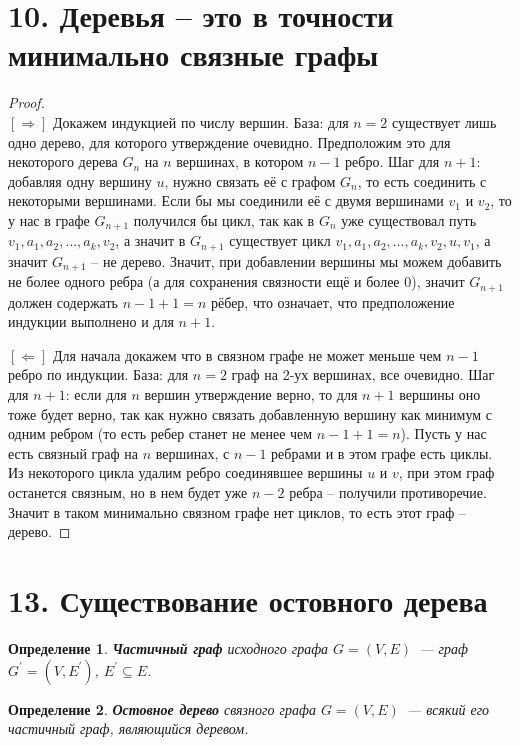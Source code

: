 \documentclass[a4paper,12pt]{article}
\newtheorem*{defin}{Определение}
\begin{document}
    \section*{10. Деревья -- это в точности минимально связные графы}
    \begin{proof}\ \\
        $[\Rightarrow]$ Докажем индукцией по числу вершин. База: для $n = 2$ существует лишь одно дерево, для которого утверждение очевидно. Предположим это для некоторого дерева $G_{n}$ на $n$ вершинах, в котором $n - 1$ ребро. Шаг для $n + 1$: добавляя одну вершину $u$, нужно связать её с графом $G_{n}$, то есть соединить с некоторыми вершинами. Если бы мы соединили её с двумя вершинами $v_{1}$ и $v_{2}$, то у нас в графе $G_{n+1}$ получился бы цикл, так как в $G_{n}$ уже существовал путь $v_{1}, a_{1}, a_{2},\ldots, a_{k}, v_{2}$, а значит в $G_{n+1}$ существует цикл $v_{1}, a_{1}, a_{2},\ldots, a_{k}, v_{2}, u, v_{1}$, а значит $G_{n+1}$ -- не дерево. Значит, при добавлении вершины мы можем добавить не более одного ребра (а для сохранения связности ещё и более 0), значит $G_{n+1}$ должен содержать $n - 1 + 1 = n$ рёбер, что означает, что предположение индукции выполнено и для $n + 1$.
        
        \noindent$[\Leftarrow]$ Для начала докажем что в связном графе не может меньше чем $n - 1$ ребро по индукции. База: для $n = 2$ граф на 2-ух вершинах, все очевидно. Шаг для $n + 1$: если для $n$ вершин утверждение верно, то для $n + 1$ вершины оно тоже будет верно, так как нужно связать добавленную вершину как минимум с одним ребром (то есть ребер станет не менее чем $n - 1 + 1 = n$). Пусть у нас есть связный граф на $n$ вершинах, с $n - 1$ ребрами и в этом графе есть циклы. Из некоторого цикла удалим ребро соединявшее вершины $u$ и $v$, при этом граф останется связным, но в нем будет уже $n - 2$ ребра -- получили противоречие. Значит в таком минимально связном графе нет циклов, то есть этот граф -- дерево.
    \end{proof}

 	\section*{13. Существование остовного дерева}
 	\begin{defin} \textbf{Частичный граф} исходного графа 
 		$G = (V, E)$ — граф $G^{\prime} = (V, E^{\prime})$, $E^{\prime} \subseteq E$.
	\end{defin}

	\begin{defin} \textbf{Остовное дерево} связного графа $G = (V, E)$ — всякий его частичный граф, являющийся деревом.
	\end{defin}
\end{document}
